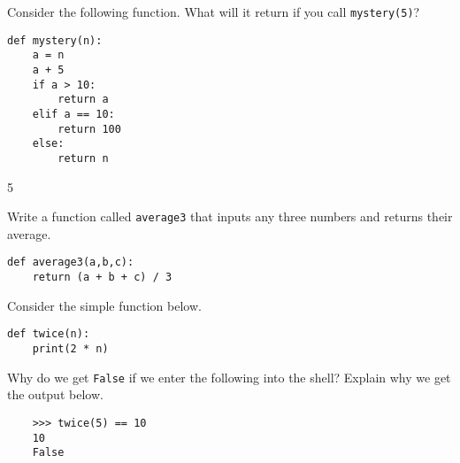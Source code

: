 \documentclass[12pt,answers]{exam}
\begin{document}
\begin{questions}

\newpage
\question Consider the following function.  What will it return if you call \lstinline{mystery(5)}?

\begin{lstlisting}
def mystery(n):
    a = n 
    a + 5
    if a > 10:
        return a
    elif a == 10:
        return 100
    else:
        return n
\end{lstlisting}
\begin{solution}
5
\end{solution}

\question Write a function called \lstinline{average3} that inputs any three numbers and returns their average.  
\begin{solution}
\begin{lstlisting}
def average3(a,b,c):
    return (a + b + c) / 3
\end{lstlisting}
\end{solution}
\vfill

\question Consider the simple function below.

\begin{lstlisting}
def twice(n):
    print(2 * n)
\end{lstlisting}

Why do we get \lstinline{False} if we enter the following into the shell? Explain why we get the output below. 

\begin{verbatim}
    >>> twice(5) == 10
    10
    False
\end{verbatim}


\end{questions}
\end{document}
